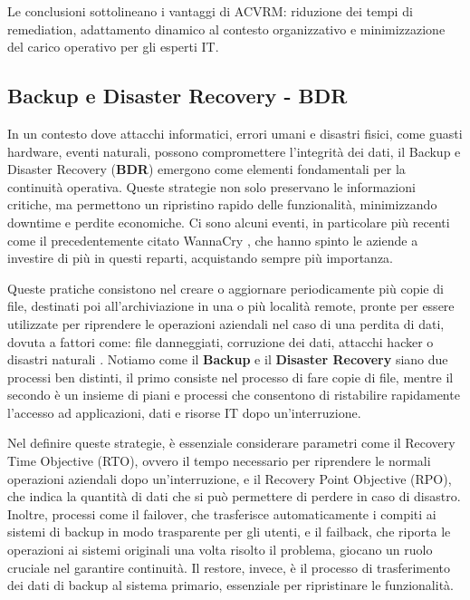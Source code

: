                 Le conclusioni sottolineano i vantaggi di ACVRM: riduzione dei tempi di remediation, adattamento dinamico al contesto organizzativo e minimizzazione del carico operativo per gli esperti IT.
                
    \subsection{Backup e Disaster Recovery - BDR}
        In un contesto dove attacchi informatici, errori umani e disastri fisici, come guasti hardware, eventi naturali, possono compromettere l'integrità dei dati, il Backup e Disaster Recovery (\textbf{BDR}) emergono come elementi fondamentali per la continuità operativa. Queste strategie non solo preservano le informazioni critiche, ma permettono un ripristino rapido delle funzionalità, minimizzando downtime e perdite economiche. Ci sono alcuni eventi, in particolare più recenti come il precedentemente citato WannaCry \cite{eternalblue_wiki}, che hanno spinto le aziende a investire di più in questi reparti, acquistando sempre più importanza.

        Queste pratiche consistono nel creare o aggiornare periodicamente più copie di file, destinati poi all'archiviazione in una o più località remote, pronte per essere utilizzate per riprendere le operazioni aziendali nel caso di una perdita di dati, dovuta a fattori come: file danneggiati, corruzione dei dati, attacchi hacker o disastri naturali \cite{ibm_backup_dis_rec_site}. Notiamo come il \textbf{Backup} e il \textbf{Disaster Recovery} siano due processi ben distinti, il primo consiste nel processo di fare copie di file, mentre il secondo è un insieme di piani e processi che consentono di ristabilire rapidamente l'accesso ad applicazioni, dati e risorse IT dopo un'interruzione.
        
        Nel definire queste strategie, è essenziale considerare parametri come il Recovery Time Objective (RTO), ovvero il tempo necessario per riprendere le normali operazioni aziendali dopo un'interruzione, e il Recovery Point Objective (RPO), che indica la quantità di dati che si può permettere di perdere in caso di disastro. Inoltre, processi come il failover, che trasferisce automaticamente i compiti ai sistemi di backup in modo trasparente per gli utenti, e il failback, che riporta le operazioni ai sistemi originali una volta risolto il problema, giocano un ruolo cruciale nel garantire continuità. Il restore, invece, è il processo di trasferimento dei dati di backup al sistema primario, essenziale per ripristinare le funzionalità.

